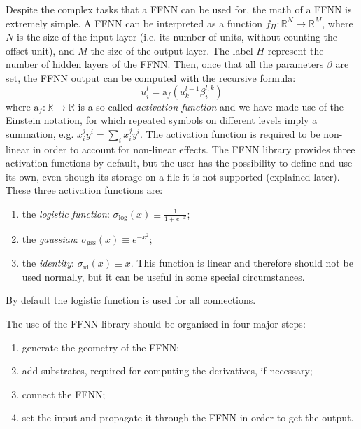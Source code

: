 \documentclass[11pt,a4paper,twoside]{article}
\newcommand{\actf}{\text{a}_f}
\newcommand{\logaf}{\sigma_{\text{log}}}
\newcommand{\gssaf}{\sigma_{\text{gss}}}
\newcommand{\idaf}{\sigma_{\text{id}}}
\begin{document}
Despite the complex tasks that a FFNN can be used for, the math of a FFNN is extremely simple.
A FFNN can be interpreted as a function $f_H: \mathbb{R}^N \rightarrow \mathbb{R}^M$, where $N$ is the size of the input layer (i.e. its number of units, without counting the offset unit), and $M$ the size of the output layer.
The label $H$ represent the number of hidden layers of the FFNN.
Then, once that all the parameters $\beta$ are set, the FFNN output can be computed with the recursive formula:
\begin{equation}
   u^l_i = \actf( u^{l-1}_{k} \beta^{l,k}_{i}  )
\end{equation} 
where $\actf: \mathbb{R} \rightarrow \mathbb{R}$ is a so-called \emph{activation function} and we have made use of the Einstein notation, for which repeated symbols on different levels imply a summation, e.g. $x_i^j y^i = \sum_i x_i^j y^i$.
The activation function is required to be non-linear in order to account for non-linear effects.
The FFNN library provides three activation functions by default, but the user has the possibility to define and use its own, even though its storage on a file it is not supported (explained later).
These three activation functions are:
\begin{enumerate}
   \item the \emph{logistic function}: $\logaf(x) \equiv \frac{1}{1+e^{-x}}$;
   \item the \emph{gaussian}: $\gssaf(x) \equiv e^{-x^2}$;
   \item the \emph{identity}: $\idaf(x) \equiv x$. This function is linear and therefore should not be used normally, but it can be useful in some special circumstances.
\end{enumerate}
By default the logistic function is used for all connections.

The use of the FFNN library should be organised in four major steps:
\begin{enumerate}
   \item generate the geometry of the FFNN;
   \item add substrates, required for computing the derivatives, if necessary;
   \item connect the FFNN;
   \item set the input and propagate it through the FFNN in order to get the output.
\end{enumerate}
\end{document}

